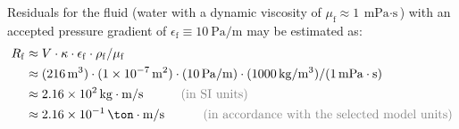 Residuals for the fluid (water with a dynamic viscosity of $\mu_\mathrm{f}
    \approx \qty{1}{\milli\pascal\cdot\second} $) with an accepted pressure
gradient of $ \epsilon_\mathrm{f} \equiv \qty[per-mode =
        symbol]{10}{\pascal\per\metre} $ may be estimated as:
\begin{equation}
    \begin{split}
        R_\mathrm{f} & \approx V \cdot \kappa \cdot \epsilon_\mathrm{f} \cdot \rho_\mathrm{f} / { \mu_\mathrm{f} }                                                                                                                                        \\
                     & \approx (\qty{216}{\cubic\metre}) \cdot (\qty{1E-7}{\square\metre}) \cdot (\qty[per-mode = symbol]{10}{\pascal\per\metre}) \cdot (\qty[per-mode = symbol]{1000}{\kilogram\per\cubic\metre}) / (\qty{1}{\milli\pascal\cdot\second}) \\
                     & \approx \qty{2.16E+2}{\kilogram\cdot\metre\per\second}  \hspace{3.00em} \text{\light{(in SI units)}}                                                                                                                               \\
                     & \approx \qty{2.16E-1}{\ton\cdot\metre\per\second}       \hspace{3.09em} \text{\light{(in accordance with the selected model units)}}
    \end{split}
\end{equation}


